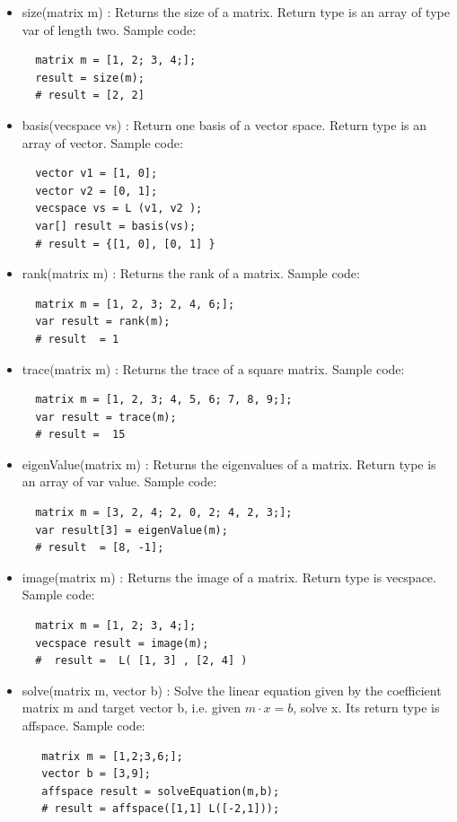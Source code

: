 \documentclass[12pt]{article} %
\begin{document}
\begin{itemize}
\item size(matrix m)
: Returns the size of a matrix. Return type is an array of type var of length two. Sample code:
\begin{lstlisting}
  matrix m = [1, 2; 3, 4;];
  result = size(m);
  # result = [2, 2]
\end{lstlisting}

\item basis(vecspace vs)
: Return one basis of a vector space. Return type is an array of vector. Sample code:
\begin{lstlisting}
  vector v1 = [1, 0];
  vector v2 = [0, 1];
  vecspace vs = L (v1, v2 );
  var[] result = basis(vs);
  # result = {[1, 0], [0, 1] }
\end{lstlisting}

\item rank(matrix m)
: Returns the rank of a matrix. Sample code:
\begin{lstlisting}
  matrix m = [1, 2, 3; 2, 4, 6;];
  var result = rank(m);
  # result  = 1
\end{lstlisting}

\item trace(matrix m)
: Returns the trace of a square matrix. Sample code:
\begin{lstlisting}
  matrix m = [1, 2, 3; 4, 5, 6; 7, 8, 9;];
  var result = trace(m);
  # result =  15
\end{lstlisting}

\item eigenValue(matrix m)
: Returns the eigenvalues of a matrix. Return type is an array of var value. Sample code:
\begin{lstlisting}
  matrix m = [3, 2, 4; 2, 0, 2; 4, 2, 3;];
  var result[3] = eigenValue(m);
  # result  = [8, -1];
\end{lstlisting}

\item image(matrix m)
: Returns the image of a matrix. Return type is vecspace. Sample code:
\begin{lstlisting}
  matrix m = [1, 2; 3, 4;];
  vecspace result = image(m);
  #  result =  L( [1, 3] , [2, 4] )
\end{lstlisting}

\item solve(matrix m, vector b)
: Solve the linear equation given by the coefficient matrix m and target vector b, i.e. given $m\cdot x = b$, solve x. Its return type is affspace. Sample code:
\begin{lstlisting}
   matrix m = [1,2;3,6;]; 
   vector b = [3,9];
   affspace result = solveEquation(m,b);
   # result = affspace([1,1] L([-2,1]));
\end{lstlisting}
\end{itemize}
\end{document}
